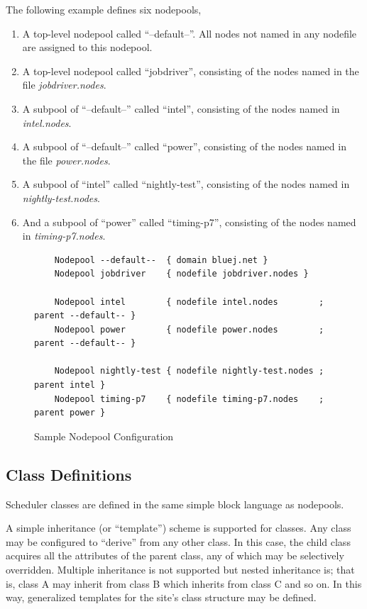     The following example defines six nodepools, 
    \begin{enumerate}
      \item A top-level nodepool called ``--default--''.  All nodes not named
        in any nodefile are assigned to this nodepool.
      \item A top-level nodepool called ``jobdriver'', consisting of the nodes
        named in the file {\em jobdriver.nodes}.
      \item A subpool of ``--default--'' called ``intel'', consisting of the
        nodes named in {\em intel.nodes}.
      \item A subpool of ``--default--'' called ``power'', consisting of the
        nodes named in the file {\em power.nodes}.
      \item A subpool of ``intel'' called ``nightly-test'', consisting of the 
        nodes named in {\em nightly-test.nodes}.
      \item And a subpool of ``power'' called ``timing-p7'', consisting of the
        nodes named in {\em timing-p7.nodes}.
    \end{enumerate}

    \begin{figure}[H]
    
\begin{verbatim}
    Nodepool --default--  { domain bluej.net }
    Nodepool jobdriver    { nodefile jobdriver.nodes }
    
    Nodepool intel        { nodefile intel.nodes        ; parent --default-- }
    Nodepool power        { nodefile power.nodes        ; parent --default-- }

    Nodepool nightly-test { nodefile nightly-test.nodes ; parent intel }
    Nodepool timing-p7    { nodefile timing-p7.nodes    ; parent power }
\end{verbatim}
      \caption{Sample Nodepool Configuration}
      \label{fig:nodepool.configuration}

    \end{figure}    


    \subsection{Class Definitions}
    \label{subsubsec:class.configuration}

    Scheduler classes are defined in the same simple block language as
    nodepools.

    A simple inheritance (or ``template'') scheme is supported for classes.  Any
    class may be configured to ``derive'' from any other class.  In this case, the
    child class acquires all the attributes of the parent class, any of which may
    be selectively overridden.  Multiple inheritance is not supported but
    nested inheritance is; that is, class A may inherit from class B which inherits
    from class C and so on. In this way, generalized templates for the site's
    class structure may be defined.  


